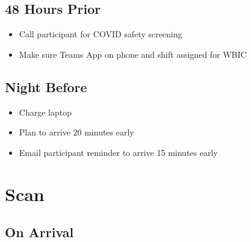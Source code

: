 \documentclass[
]{book}
\providecommand{\tightlist}{%
  \setlength{\itemsep}{0pt}\setlength{\parskip}{0pt}}
\begin{document}
\hypertarget{hours-prior}{%
\subsection{48 Hours Prior}\label{hours-prior}}

\begin{itemize}
\tightlist
\item
  Call participant for COVID safety screening
\item
  Make sure Teams App on phone and shift assigned for WBIC
\end{itemize}

\hypertarget{night-before}{%
\subsection{Night Before}\label{night-before}}

\begin{itemize}
\tightlist
\item
  Charge laptop
\item
  Plan to arrive 20 minutes early
\item
  Email participant reminder to arrive 15 minutes early
\end{itemize}

\hypertarget{scan}{%
\section{Scan}\label{scan}}

\hypertarget{on-arrival}{%
\subsection{On Arrival}\label{on-arrival}}
\end{document}

